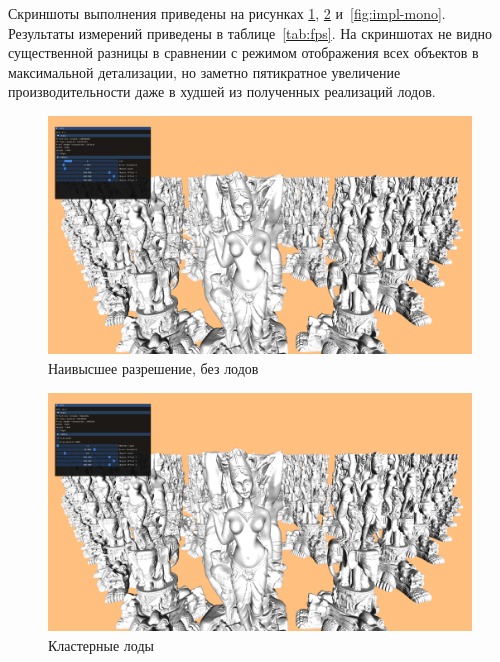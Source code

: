 Скриншоты выполнения приведены на рисунках \ref{fig:impl-lod0}, \ref{fig:impl-cluster-2} и~\ref{fig:impl-mono}.
Результаты измерений приведены в таблице~\ref{tab:fps}.
На скриншотах не видно существенной разницы в сравнении с режимом отображения всех объектов в максимальной детализации, но заметно пятикратное увеличение производительности даже в худшей из полученных реализаций лодов.

\begin{figure}[H]
    \centering
    \includegraphics[width=\textwidth]{pics/comparison-0.png}
    \caption{Наивысшее разрешение, без лодов}
    \label{fig:impl-lod0}
\end{figure}


\begin{figure}[H]
    \centering
    \includegraphics[width=\textwidth]{pics/comparison-2.png}
    \caption{Кластерные лоды}
    \label{fig:impl-cluster-2}
\end{figure}

